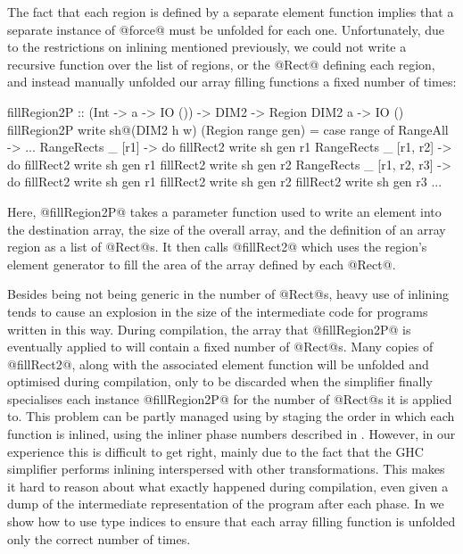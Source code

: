 The fact that each region is defined by a separate element function implies that a separate instance of @force@ must be unfolded for each one. Unfortunately, due to the restrictions on inlining mentioned previously, we could not write a recursive function over the list of regions, or the @Rect@ defining each region, and instead manually unfolded our array filling functions a fixed number of times:
%
\begin{small}
\begin{code}
  fillRegion2P :: (Int -> a -> IO ()) 
               -> DIM2 -> Region DIM2 a -> IO ()
  fillRegion2P write sh@(DIM2 h w) (Region range gen)
   = case range of
      RangeAll -> ...
      RangeRects _ [r1]
       -> do fillRect2 write sh gen r1
      RangeRects _ [r1, r2]
       -> do fillRect2 write sh gen r1
             fillRect2 write sh gen r2
      RangeRects _ [r1, r2, r3]
       -> do fillRect2 write sh gen r1
             fillRect2 write sh gen r2
             fillRect2 write sh gen r3
      ...
\end{code}
\end{small}
%
Here, @fillRegion2P@ takes a parameter function used to write an element into the destination array, the size of the overall array, and the definition of an array region as a list of @Rect@s. It then calls @fillRect2@ which uses the region's element generator to fill the area of the array defined by each @Rect@.

Besides being not being generic in the number of @Rect@s, heavy use of inlining tends to cause an explosion in the size of the intermediate code for programs written in this way. During compilation, the array that @fillRegion2P@ is eventually applied to will contain a fixed number of @Rect@s. Many copies of @fillRect2@, along with the associated element function will be unfolded and optimised during compilation, only to be discarded when the simplifier finally specialises each instance @fillRegion2P@ for the number of @Rect@s it is applied to. This problem can be partly managed using by staging the order in which each function is inlined, using the inliner phase numbers described in \CITE. However, in our experience this is difficult to get right, mainly due to the fact that the GHC simplifier performs inlining interspersed with other transformations. This makes it hard to reason about what exactly happened during compilation, even given a dump of the intermediate representation of the program after each phase. In \REF we show how to use type indices to ensure that each array filling function is unfolded only the correct number of times.


